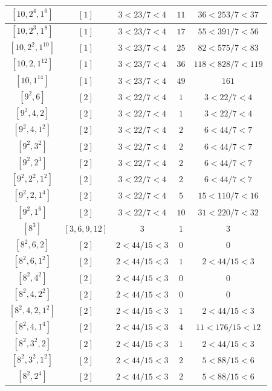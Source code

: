 \documentclass{article}%
\begin{document}
\begin{center}
\begin{longtable}{||c|c|c|c|c||}
$[10, 2^{4}, 1^{6}]$ & $[1]$ & $3 < 23/7 < 4$ & $11$ & $36 < 253/7 < 37$ \\ \hline 
$[10, 2^{3}, 1^{8}]$ & $[1]$ & $3 < 23/7 < 4$ & $17$ & $55 < 391/7 < 56$ \\ \hline 
$[10, 2^{2}, 1^{10}]$ & $[1]$ & $3 < 23/7 < 4$ & $25$ & $82 < 575/7 < 83$ \\ \hline 
$[10, 2, 1^{12}]$ & $[1]$ & $3 < 23/7 < 4$ & $36$ & $118 < 828/7 < 119$ \\ \hline 
$[10, 1^{14}]$ & $[1]$ & $3 < 23/7 < 4$ & $49$ & $161$ \\ \hline 
$[9^{2}, 6]$ & $[2]$ & $3 < 22/7 < 4$ & $1$ & $3 < 22/7 < 4$ \\ \hline 
$[9^{2}, 4, 2]$ & $[2]$ & $3 < 22/7 < 4$ & $1$ & $3 < 22/7 < 4$ \\ \hline 
$[9^{2}, 4, 1^{2}]$ & $[2]$ & $3 < 22/7 < 4$ & $2$ & $6 < 44/7 < 7$ \\ \hline 
$[9^{2}, 3^{2}]$ & $[2]$ & $3 < 22/7 < 4$ & $2$ & $6 < 44/7 < 7$ \\ \hline 
$[9^{2}, 2^{3}]$ & $[2]$ & $3 < 22/7 < 4$ & $2$ & $6 < 44/7 < 7$ \\ \hline 
$[9^{2}, 2^{2}, 1^{2}]$ & $[2]$ & $3 < 22/7 < 4$ & $2$ & $6 < 44/7 < 7$ \\ \hline 
$[9^{2}, 2, 1^{4}]$ & $[2]$ & $3 < 22/7 < 4$ & $5$ & $15 < 110/7 < 16$ \\ \hline 
$[9^{2}, 1^{6}]$ & $[2]$ & $3 < 22/7 < 4$ & $10$ & $31 < 220/7 < 32$ \\ \hline 
$[8^{3}]$ & $[3, 6, 9, 12]$ & $3$ & $1$ & $3$ \\ \hline 
$[8^{2}, 6, 2]$ & $[2]$ & $2 < 44/15 < 3$ & $0$ & $0$ \\ \hline 
$[8^{2}, 6, 1^{2}]$ & $[2]$ & $2 < 44/15 < 3$ & $1$ & $2 < 44/15 < 3$ \\ \hline 
$[8^{2}, 4^{2}]$ & $[2]$ & $2 < 44/15 < 3$ & $0$ & $0$ \\ \hline 
$[8^{2}, 4, 2^{2}]$ & $[2]$ & $2 < 44/15 < 3$ & $0$ & $0$ \\ \hline 
$[8^{2}, 4, 2, 1^{2}]$ & $[2]$ & $2 < 44/15 < 3$ & $1$ & $2 < 44/15 < 3$ \\ \hline 
$[8^{2}, 4, 1^{4}]$ & $[2]$ & $2 < 44/15 < 3$ & $4$ & $11 < 176/15 < 12$ \\ \hline 
$[8^{2}, 3^{2}, 2]$ & $[2]$ & $2 < 44/15 < 3$ & $1$ & $2 < 44/15 < 3$ \\ \hline 
$[8^{2}, 3^{2}, 1^{2}]$ & $[2]$ & $2 < 44/15 < 3$ & $2$ & $5 < 88/15 < 6$ \\ \hline 
$[8^{2}, 2^{4}]$ & $[2]$ & $2 < 44/15 < 3$ & $2$ & $5 < 88/15 < 6$ \\ \hline 

\end{longtable}
\end{center}
\end{document}
